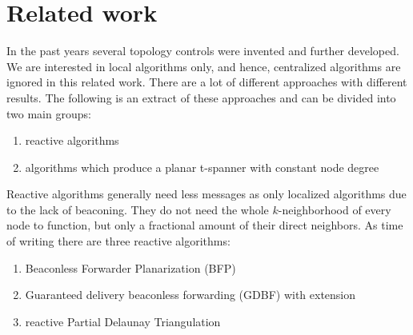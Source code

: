

%



\section{Related work}

In the past years several topology controls were invented and further developed.
We are interested in local algorithms only, and hence, centralized algorithms are ignored in this related work.
There are a lot of different approaches with different results.
The following is an extract of these approaches and can be divided into two main groups:
\begin{enumerate}
\item reactive algorithms
\item algorithms which produce a planar t-spanner with constant node degree
\end{enumerate}

Reactive algorithms generally need less messages as only localized algorithms due to the lack of beaconing.
They do not need the whole $k $-neighborhood of every node to function, but only a fractional amount of their direct neighbors.
As time of writing there are three reactive algorithms:
\begin{enumerate}
\item Beaconless Forwarder Planarization (BFP)
\item Guaranteed delivery beaconless forwarding (GDBF) with extension
\item reactive Partial Delaunay Triangulation
\end{enumerate}

